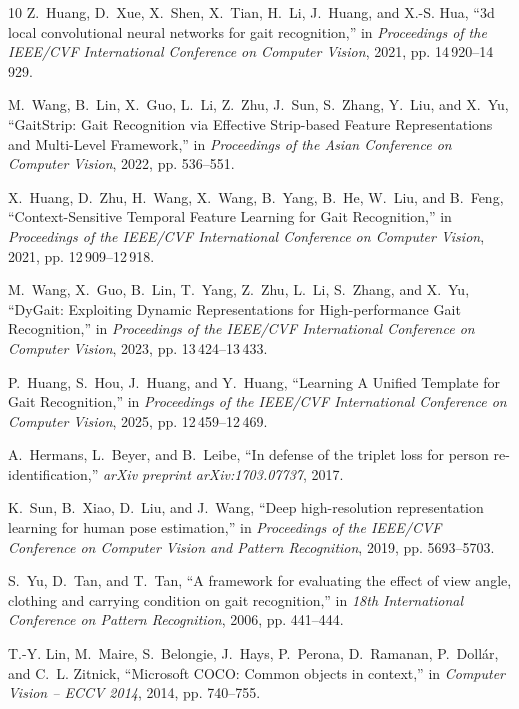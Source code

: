 \documentclass[journal]{IEEEtran}
\begin{document}
\begin{thebibliography}{10}
Z.~Huang, D.~Xue, X.~Shen, X.~Tian, H.~Li, J.~Huang, and X.-S. Hua, ``3d local
  convolutional neural networks for gait recognition,'' in \emph{{Proceedings
  of the IEEE/CVF International Conference on Computer Vision}}, 2021, pp.
  14\,920--14\,929.

M.~Wang, B.~Lin, X.~Guo, L.~Li, Z.~Zhu, J.~Sun, S.~Zhang, Y.~Liu, and X.~Yu,
  ``{GaitStrip: Gait Recognition via Effective Strip-based Feature
  Representations and Multi-Level Framework},'' in \emph{{Proceedings of the
  Asian Conference on Computer Vision}}, 2022, pp. 536--551.

X.~Huang, D.~Zhu, H.~Wang, X.~Wang, B.~Yang, B.~He, W.~Liu, and B.~Feng,
  ``{Context-Sensitive Temporal Feature Learning for Gait Recognition},'' in
  \emph{{Proceedings of the IEEE/CVF International Conference on Computer
  Vision}}, 2021, pp. 12\,909--12\,918.

M.~Wang, X.~Guo, B.~Lin, T.~Yang, Z.~Zhu, L.~Li, S.~Zhang, and X.~Yu,
  ``{DyGait: Exploiting Dynamic Representations for High-performance Gait
  Recognition},'' in \emph{{Proceedings of the IEEE/CVF International
  Conference on Computer Vision}}, 2023, pp. 13\,424--13\,433.

P.~Huang, S.~Hou, J.~Huang, and Y.~Huang, ``{Learning A Unified Template for
  Gait Recognition},'' in \emph{{Proceedings of the IEEE/CVF International
  Conference on Computer Vision}}, 2025, pp. 12\,459--12\,469.

A.~Hermans, L.~Beyer, and B.~Leibe, ``In defense of the triplet loss for person
  re-identification,'' \emph{{arXiv preprint arXiv:1703.07737}}, 2017.

K.~Sun, B.~Xiao, D.~Liu, and J.~Wang, ``Deep high-resolution representation
  learning for human pose estimation,'' in \emph{{Proceedings of the IEEE/CVF
  Conference on Computer Vision and Pattern Recognition}}, 2019, pp.
  5693--5703.

S.~Yu, D.~Tan, and T.~Tan, ``A framework for evaluating the effect of view
  angle, clothing and carrying condition on gait recognition,'' in \emph{{18th
  International Conference on Pattern Recognition}}, 2006, pp. 441--444.

T.-Y. Lin, M.~Maire, S.~Belongie, J.~Hays, P.~Perona, D.~Ramanan,
  P.~Doll{\'a}r, and C.~L. Zitnick, ``Microsoft {COCO}: Common objects in
  context,'' in \emph{{Computer Vision -- ECCV 2014}}, 2014, pp. 740--755.


\end{thebibliography}
\end{document}

